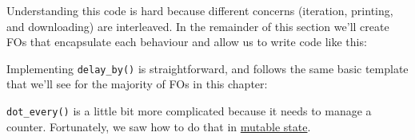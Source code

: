\begin{Shaded}
\end{Shaded}

Understanding this code is hard because different concerns (iteration,
printing, and downloading) are interleaved. In the remainder of this
section we'll create FOs that encapsulate each behaviour and allow us to
write code like this:

\begin{Shaded}
\begin{Highlighting}[]
\NormalTok{(}\NormalTok{, }\NormalTok{(}
\end{Highlighting}
\end{Shaded}

Implementing \texttt{delay\_by()} is straightforward, and follows the
same basic template that we'll see for the majority of FOs in this
chapter: 

\begin{Shaded}
\begin{Highlighting}[]
\StringTok{ }
  \NormalTok{\}}
\NormalTok{\}}
\NormalTok{(}\NormalTok{(}\NormalTok{))}
\NormalTok{(}\NormalTok{(}\NormalTok{))}
\end{Highlighting}
\end{Shaded}

\texttt{dot\_every()} is a little bit more complicated because it needs
to manage a counter. Fortunately, we saw how to do that in
\hyperref[mutable-state]{mutable state}. 

